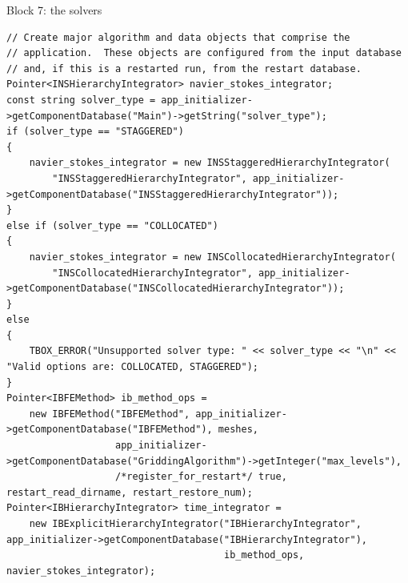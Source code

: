 \documentclass[aspectratio=169,11pt]{beamer}
\begin{document}
\begin{frame}[fragile]{Block 7: the solvers}
\label{fr:solvers}
\begin{lstlisting}[style=cpptiny]
// Create major algorithm and data objects that comprise the
// application.  These objects are configured from the input database
// and, if this is a restarted run, from the restart database.
Pointer<INSHierarchyIntegrator> navier_stokes_integrator;
const string solver_type = app_initializer->getComponentDatabase("Main")->getString("solver_type");
if (solver_type == "STAGGERED")
{
    navier_stokes_integrator = new INSStaggeredHierarchyIntegrator(
        "INSStaggeredHierarchyIntegrator", app_initializer->getComponentDatabase("INSStaggeredHierarchyIntegrator"));
}
else if (solver_type == "COLLOCATED")
{
    navier_stokes_integrator = new INSCollocatedHierarchyIntegrator(
        "INSCollocatedHierarchyIntegrator", app_initializer->getComponentDatabase("INSCollocatedHierarchyIntegrator"));
}
else
{
    TBOX_ERROR("Unsupported solver type: " << solver_type << "\n" << "Valid options are: COLLOCATED, STAGGERED");
}
Pointer<IBFEMethod> ib_method_ops =
    new IBFEMethod("IBFEMethod", app_initializer->getComponentDatabase("IBFEMethod"), meshes,
                   app_initializer->getComponentDatabase("GriddingAlgorithm")->getInteger("max_levels"),
                   /*register_for_restart*/ true, restart_read_dirname, restart_restore_num);
Pointer<IBHierarchyIntegrator> time_integrator =
    new IBExplicitHierarchyIntegrator("IBHierarchyIntegrator", app_initializer->getComponentDatabase("IBHierarchyIntegrator"),
                                      ib_method_ops, navier_stokes_integrator);
\end{lstlisting}
\end{frame}
\end{document}
